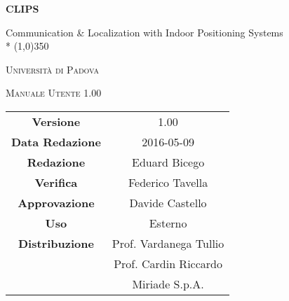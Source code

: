 \documentclass[a4paper,12pt]{article}
\author{Eduard Bicego}
\date{01/05/2016}
\begin{document}
\begin{titlepage}
	\centering
	{\huge\bfseries CLIPS\par}
	Communication \& Localization with Indoor Positioning Systems \\*
	\line(1,0){350} \\
	{\scshape\LARGE Università di Padova \par}
	\vspace{1cm}
	{\scshape\Large Manuale Utente 1.00 \par}
	\logo
	\newpage
	\begin{tabular}{c|c}
		{\hfill \textbf{Versione}} 			& 1.00					\\
		{\hfill\textbf{Data Redazione}} 		& 2016-05-09  		\\
		{\hfill\textbf{Redazione}} 			& Eduard Bicego			\\
		{\hfill\textbf{Verifica}} 				&  Federico Tavella					\\
		{\hfill\textbf{Approvazione}} 		& Davide Castello		\\
		{\hfill\textbf{Uso}} 					& Esterno			\\
		{\hfill\textbf{Distribuzione}} 			& Prof. Vardanega Tullio \\
												& Prof. Cardin Riccardo \\
												& Miriade S.p.A. 		\\
	\end{tabular}
\end{titlepage}
	
	\newpage
	\pagestyle{myfront}
	
		\newpage
			
		\newpage
			\tableofcontents
		\newpage
			\listoffigures
	\label{LastFrontPage}

	\newpage
		\pagestyle{mymain}
	\newpage
		
	\newpage
		
	\newpage
		
	\newpage
		
	\newpage
		
	\newpage
		
	

		
	\label{LastPage}
\end{document}
